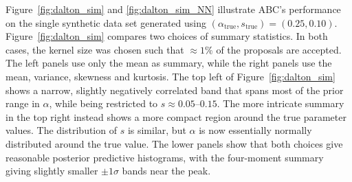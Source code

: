 \documentclass[a4paper, 12pt]{article}
\begin{document}
\vspace{-0.1cm}
Figure~\ref{fig:dalton_sim} and \ref{fig:dalton_sim_NN} illustrate ABC's performance on the single synthetic data set generated using $(\alpha_\text{true}, s_\text{true}) = (0.25, 0.10)$. Figure~\ref{fig:dalton_sim} compares two choices of summary statistics. In both cases, the kernel size was chosen such that $\approx 1\%$ of the proposals are accepted. The left panels use only the mean as summary, while the right panels use the mean, variance, skewness and kurtosis. The top left of Figure~\ref{fig:dalton_sim} shows a narrow, slightly negatively correlated band that spans most of the prior range in $\alpha$, while being restricted to $s \approx 0.05$--$0.15$. The more intricate summary in the top right instead shows a more compact region around the true parameter values. The distribution of $s$ is similar, but $\alpha$ is now essentially normally distributed around the true value. The lower panels show that both choices give reasonable posterior predictive histograms, with the four-moment summary giving slightly smaller $\pm 1\sigma$ bands near the peak.
\end{document}
